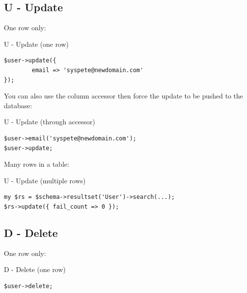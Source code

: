 


\subsection{U - Update}

One row only:

\begin{frame}[fragile]{U - Update (one row)}
\begin{lstlisting}
$user->update({
        email => 'syspete@newdomain.com'
});
\end{lstlisting}
\end{frame}

You can also use the column accessor then force the update to be pushed to
the database:

\begin{frame}[fragile]{U - Update (through accessor)}
\begin{lstlisting}
$user->email('syspete@newdomain.com');
$user->update;
\end{lstlisting}
\end{frame}

Many rows in a table:

\begin{frame}[fragile]{U - Update (multiple rows)}
\begin{lstlisting}
my $rs = $schema->resultset('User')->search(...);
$rs->update({ fail_count => 0 });
\end{lstlisting}
\end{frame}

\subsection{D - Delete}

One row only:

\begin{frame}[fragile]{D - Delete (one row)}
\begin{lstlisting}
$user->delete;
\end{lstlisting}
\end{frame}

